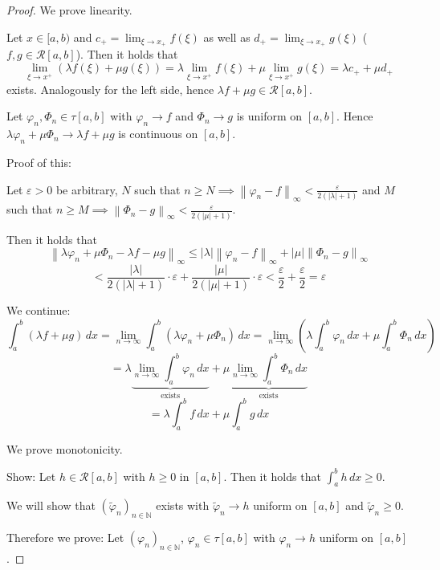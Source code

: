 \documentclass{article}
\newcommand{\norm}[1]{\left\|#1\right\|}
\newcommand{\card}[1]{\left|#1\right|}
\begin{document}
\begin{proof}
  We prove linearity.

  Let $x \in [a,b)$ and $c_+ = \lim_{\xi \to x_+} f(\xi)$ as well as $d_+ = \lim_{\xi \to x_+} g(\xi)$
  ($f,g \in \mathcal R[a,b]$). Then it holds that
  \[
    \lim_{\xi \to x^+} (\lambda f(\xi) + \mu g(\xi))
      = \lambda \lim_{\xi \to x^+} f(\xi) + \mu \lim_{\xi \to x^+} g(\xi)
      = \lambda c_+ + \mu d_+
  \]
  exists. Analogously for the left side, hence $\lambda f + \mu g \in \mathcal R[a,b]$.

  Let $\varphi_n, \Phi_n \in \tau[a,b]$ with $\varphi_n \to f$ and $\Phi_n \to g$ is uniform on $[a,b]$.
  Hence $\lambda \varphi_n + \mu \Phi_n \to \lambda f + \mu g$ is continuous on $[a,b]$.

  Proof of this:

  Let $\varepsilon > 0$ be arbitrary,
  $N$ such that $n \geq N \implies \norm{\varphi_n - f}_{\infty} < \frac{\varepsilon}{2(\card{\lambda} + 1)}$
  and $M$ such that $n \geq M \implies \norm{\Phi_n - g}_{\infty} < \frac{\varepsilon}{2(\card{\mu} + 1)}$.

  Then it holds that
  \[
    \norm{\lambda \varphi_n + \mu \Phi_n - \lambda f - \mu g}_{\infty}
      \leq \card{\lambda} \norm{\varphi_n - f}_{\infty}
      + \card{\mu} \norm{\Phi_n - g}_{\infty}
  \] \[
      < \frac{\card{\lambda}}{2(\card{\lambda} + 1)} \cdot \varepsilon + \frac{\card{\mu}}{2(\card{\mu} + 1)} \cdot \varepsilon
      < \frac\varepsilon2 + \frac\varepsilon2 = \varepsilon
  \]

  We continue:
  \[
    \int_a^b (\lambda f + \mu g) \, dx = \lim_{n\to\infty} \int_a^b (\lambda \varphi_n + \mu \Phi_n) \, dx
      = \lim_{n\to\infty} (\lambda \int_a^b \varphi_n \, dx + \mu \int_a^b \Phi_n \, dx)
  \] \[
    = \lambda \underbrace{\lim_{n\to\infty} \int_a^b \varphi_n \, dx}_{\text{exists}}
    + \mu \underbrace{\lim_{n\to\infty} \int_a^b \Phi_n \, dx}_{\text{exists}}
  \] \[
    = \lambda \int_a^b f \, dx + \mu \int_a^b g \, dx
  \]

  We prove monotonicity.

  Show: Let $h \in \mathcal R[a,b]$ with $h \geq 0$ in $[a,b]$.
  Then it holds that $\int_a^b h \, dx \geq 0$.

  We will show that $(\tilde \varphi_n)_{n\in\mathbb N}$ exists with $\tilde \varphi_n \to h$ uniform on $[a,b]$
  and $\tilde \varphi_n \geq 0$.

  Therefore we prove:
  Let $(\varphi_n)_{n\in\mathbb N}$, $\varphi_n \in \tau[a,b]$ with $\varphi_n \to h$ uniform on $[a,b]$.


\end{proof}
\end{document}
